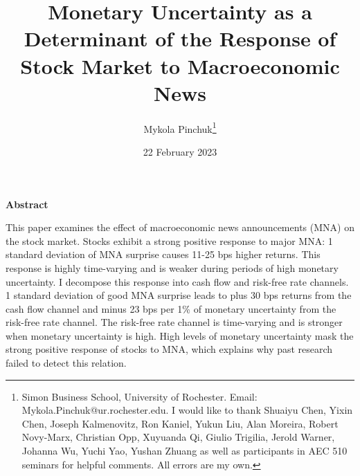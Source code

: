 \documentclass[12pt]{article}
\begin{document}
\onehalfspacing      %
\renewcommand{\footnote}{\endnote}  %

\author{\large{Mykola Pinchuk}\thanks{\rm Simon Business School, University of Rochester. Email: Mykola.Pinchuk@ur.rochester.edu. \newline I would like to thank Shuaiyu Chen, Yixin Chen, Joseph Kalmenovitz, Ron Kaniel, Yukun Liu, Alan Moreira, Robert Novy-Marx, Christian Opp, Xuyuanda Qi, Giulio Trigilia, Jerold Warner, Johanna Wu, Yuchi Yao, Yushan Zhuang as well as participants in AEC 510 seminars for helpful comments. All errors are my own.}}

\title{\bf Monetary Uncertainty as a Determinant of the Response of Stock Market to Macroeconomic News}

\date{22 February 2023}  

\maketitle
\thispagestyle{empty}

\bigskip

\normalsize

\vspace{1cm}

\centerline{\bf Abstract}

\vspace{0.5cm}

\begin{doublespace}  %
  \noindent This paper examines the effect of macroeconomic news announcements (MNA) on the stock market. Stocks exhibit a strong positive response to major MNA: 1 standard deviation of MNA surprise causes 11-25 bps higher returns. This response is highly time-varying and is weaker during periods of high monetary uncertainty. I decompose this response into cash flow and risk-free rate channels. 1 standard deviation of good MNA surprise leads to plus 30 bps returns from the cash flow channel and minus 23 bps per 1\% of monetary uncertainty from the risk-free rate channel. The risk-free rate channel is time-varying and is stronger when monetary uncertainty is high. High levels of monetary uncertainty mask the strong positive response of stocks to MNA, which explains why past research failed to detect this relation.  
\end{doublespace}
\medskip
\end{document}
